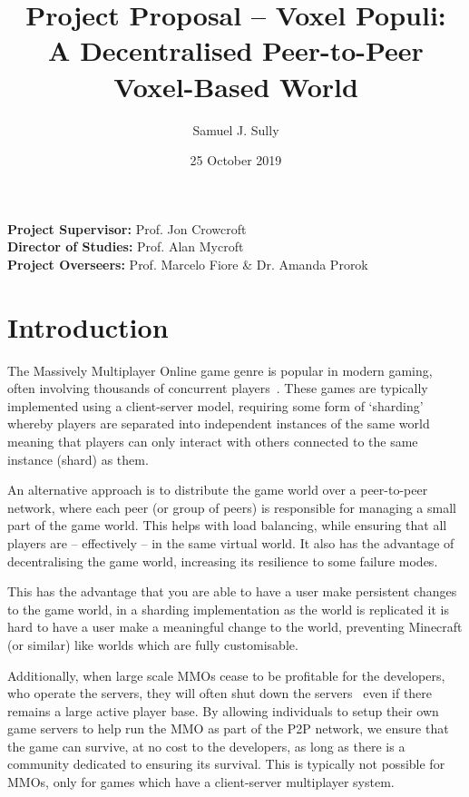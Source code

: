 \documentclass[11pt,a4paper]{article}
\begin{document}
	\title{Project Proposal -- Voxel Populi:\\ A Decentralised Peer-to-Peer Voxel-Based World}
	\author{Samuel J. Sully}
	\date{25 October 2019}
	\maketitle
	\thispagestyle{empty}
	
	\noindent
	\textbf{Project Supervisor:} Prof. Jon Crowcroft\\
	\textbf{Director of Studies:} Prof. Alan Mycroft\\
	\textbf{Project Overseers:} Prof. Marcelo Fiore \&  Dr. Amanda Prorok

	\section{Introduction}
	
	The Massively Multiplayer Online game genre is popular in modern gaming, often involving thousands of concurrent players~\cite{wowstat}. These games are typically implemented using a client-server model, requiring some form of `sharding'~\cite{shard} whereby players are separated into independent instances of the same world meaning that players can only interact with others connected to the same instance (shard) as them.
	
	An alternative approach is to distribute the game world over a peer-to-peer network, where each peer (or group of peers) is responsible for managing a small part of the game world. This helps with load balancing, while ensuring that all players are -- effectively -- in the same virtual world. It also has the advantage of decentralising the game world, increasing its resilience to some failure modes.
	
	This has the advantage that you are able to have a user make persistent changes to the game world, in a sharding implementation as the world is replicated it is hard to have a user make a meaningful change to the world, preventing Minecraft (or similar) like worlds which are fully customisable.
	
	Additionally, when large scale MMOs cease to be profitable for the developers, who operate the servers, they will often shut down the servers~\cite{down} even if there remains a large active player base. By allowing individuals to setup their own game servers to help run the MMO as part of the P2P network, we ensure that the game can survive, at no cost to the developers, as long as there is a community dedicated to ensuring its survival. This is typically not possible for MMOs, only for games which have a client-server multiplayer system.
	
\end{document}
